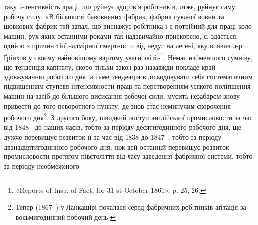 \parcont{}  %
таку інтенсивність праці, що руйнує здоров’я робітників, отже,
руйнує саму робочу силу. «В більшості бавовняних фабрик, фабрик
суканої вовни та шовкових фабрик той запал, що виснажує
робітника і є потрібний для праці коло машин, рух яких останніми
роками так надзвичайно прискорено, є, здається, однією
з причин тієї надмірної смертности від недуг на легені, яку виявив
д-р Ґрінхов у своєму найновішому вартому уваги звіті»\footnote{
«Reports of Insp. of Fact, for 31 st October 1861», p. 25, 26.
}.
Немає найменшого сумніву, що тенденція капіталу, скоро тільки
закон раз назавжди покладе край здовжуванню робочого дня,
а саме тенденція відшкодовувати себе систематичним підвищенням
ступеня інтенсивности праці та перетворенням усякого поліпшення
машин на засіб до більшого висисання робочої сили, мусить
незабаром знову привести до того поворотного пункту, де знов
стає неминучим скорочення робочого дня\footnote{
Тепер (1867~) у Ланкашірі почалася серед фабричних робітників
аґітація за восьмигодинний робочий день.
}. З другого боку,
швидкий поступ англійської промисловости за час від 1848~ до
наших часів, тобто за періоду десятигодинного робочого дня, ще
дужче перевищує розвиток її за час від 1838 до 1847~, тобто за
періоду дванадцятигодинного робочого дня, ніж цей останній
перевищує розвиток промисловости протягом півстоліття від часу
заведення фабричної системи, тобто за періоду необмеженого

